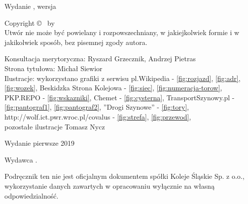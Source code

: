 
\clearpage

\begin{adjustwidth}{0.23\textwidth}{0.23\textwidth}
\begingroup
  \null\vfill
  \begin{center}
  \utitle\par
  Wydanie \uedition, wersja \urevision\par
  Copyright \copyright{} \udate\ by \uauthor\\
  Utwór nie może być powielany i rozpowszechniany, w jakiejkolwiek formie
  i w jakikolwiek sposób, bez pisemnej zgody autora.\par  
  

Konsultacja merytoryczna: Ryszard Grzecznik, Andrzej Pietras\\
Strona tytułowa: Michał Siewior\\
Ilustracje: wykorzystano grafiki z serwisu pl.Wikipedia - \ref{fig:rozjazd}, \ref{fig:adr}, \ref{fig:wozek}, Beskidzka Strona Kolejowa  - \ref{fig:siec}, \ref{fig:numeracja-torow}, PKP.REPO - \ref{fig:wskazniki}, Chemet - \ref{fig:cysterna}, TransportSzynowy.pl - \ref{fig:pantograf1}, \ref{fig:pantograf2}, ''Drogi Szynowe'' - \ref{fig:tory}, http://wolf.ict.pwr.wroc.pl/covalus - \ref{fig:strefa}, \ref{fig:przewod}, 
\\pozostałe ilustracje Tomasz Nycz
\par
  
  Wydanie pierwsze 2019\par
  Wydawca \upublisher.\par
  Podręcznik ten nie jest oficjalnym dokumentem spółki Koleje Śląskie Sp. z o.o., wykorzystanie danych zawartych w opracowaniu wyłącznie na własną odpowiedzialność.\par

  \uwebsite
  \end{center}
  \vspace*{10mm}
\endgroup
\end{adjustwidth}

\clearpage